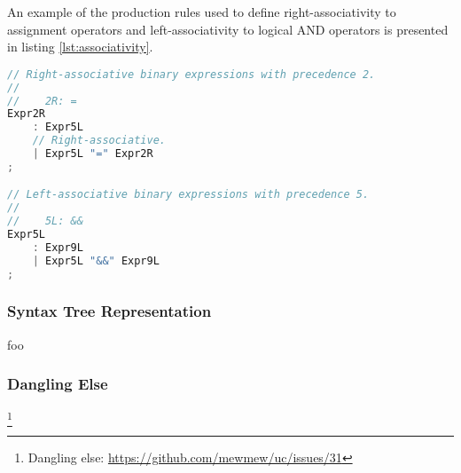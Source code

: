 An example of the production rules used to define right-associativity to assignment operators and left-associativity to logical AND operators is presented in listing \ref{lst:associativity}.

\begin{lstlisting}[language=go,style=go,caption={\label{lst:associativity}Associativity of binary expressions.}]
// Right-associative binary expressions with precedence 2.
//
//    2R: =
Expr2R
	: Expr5L
	// Right-associative.
	| Expr5L "=" Expr2R
;

// Left-associative binary expressions with precedence 5.
//
//    5L: &&
Expr5L
	: Expr9L
	| Expr5L "&&" Expr9L
;
\end{lstlisting}

\subsubsection{Syntax Tree Representation}


foo

\subsubsection{Dangling Else}

%
%
%
%
%


\footnote{Dangling else: \url{https://github.com/mewmew/uc/issues/31}}

